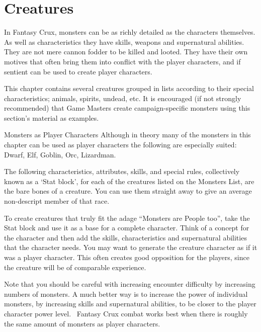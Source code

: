 \chapter{Creatures}
\label{ch:creatures}

In Fantasy Crux, monsters can be as richly detailed as the characters themselves. As well as characteristics they have skills, weapons and supernatural abilities. They are not mere cannon fodder to be killed and looted. They have their own motives that often bring them into conflict with the player characters, and if sentient can be used to create player characters.

This chapter contains several creatures grouped in lists according to their special characteristics; animals, spirits, undead, etc. It is encouraged (if not strongly recommended) that Game Masters create campaign-specific monsters using this section's material as examples.
\vspace{1em}

\begin{rpg-titlebox}{Monsters as Player Characters}
Although in theory many of the monsters in this chapter can be used as player characters the following are especially suited: Dwarf, Elf, Goblin, Orc, Lizardman. %
\end{rpg-titlebox}
  
The following characteristics, attributes, skills, and special rules, collectively known as a ‘Stat block’, for each of the creatures listed on the Monsters List, are the bare bones of a creature. You can use them straight away to give an average non-descript member of that race.

To create creatures that truly fit the adage “Monsters are People too”, take the Stat block and use it as a base for a complete character. Think of a concept for the character and then add the skills, characteristics and supernatural abilities that the character needs. You may want to generate the creature character as if it was a player character. This often creates good opposition for the players, since the creature will be of comparable experience. 

Note that you should be careful with increasing encounter difficulty by increasing numbers of monsters. A much better way is to increase the power of individual monsters, by increasing skills and supernatural abilities, to be closer to the player character power level.  Fantasy Crux combat works best when there is roughly the same amount of monsters as player characters.

